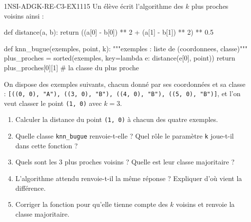 

\begin{exercice}{1NSI-ADGK-RE-C3-EX1}{1}{15}
Un élève écrit l'algorithme des $k$ plus proches voisins ainsi :
\begin{python}
def distance(a, b):
    return ((a[0] - b[0]) ** 2 + (a[1] - b[1]) ** 2) ** 0.5

def knn_bugue(exemples, point, k):
    """exemples : liste de (coordonnees, classe)"""
    plus_proches = sorted(exemples, key=lambda e: distance(e[0], point))
    return plus_proches[0][1]      # la classe du plus proche
\end{python}
On dispose des exemples suivants, chacun donné par ses coordonnées et sa classe :
\lstinline{[((0, 0), "A"), ((3, 0), "B"), ((4, 0), "B"), ((5, 0), "B")]}, et l'on veut
classer le point \lstinline{(1, 0)} avec $k = 3$.
\begin{enumerate}
  \item Calculer la distance du point \lstinline{(1, 0)} à chacun des quatre exemples.
  \item Quelle classe \lstinline{knn_bugue} renvoie-t-elle ? Quel rôle le paramètre
    \lstinline{k} joue-t-il dans cette fonction ?
  \item Quels sont les $3$ plus proches voisins ? Quelle est leur classe majoritaire ?
  \item L'algorithme attendu renvoie-t-il la même réponse ? Expliquer d'où vient la
    différence.
  \item Corriger la fonction pour qu'elle tienne compte des $k$ voisins et renvoie la
    classe majoritaire.
\end{enumerate}
\end{exercice}

